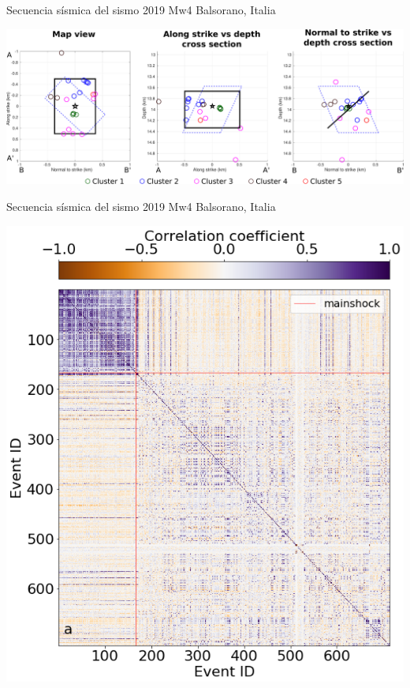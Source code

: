 \documentclass{beamer}
\begin{document}
\begin{frame}
 {Secuencia s\'ismica del sismo 2019 Mw4 Balsorano, Italia}

 \begin{minipage}{1\linewidth}
  \centering \includegraphics[width=1\linewidth]{images/S6_templates_per_cluster_map.pdf}
 \end{minipage} 
 
\end{frame}

\begin{frame}
 {Secuencia s\'ismica del sismo 2019 Mw4 Balsorano, Italia}

 \begin{minipage}{1\linewidth}
  \centering \includegraphics[width=0.65\linewidth]{images/matrix.png}
 \end{minipage} 
 
\end{frame}
\end{document}
